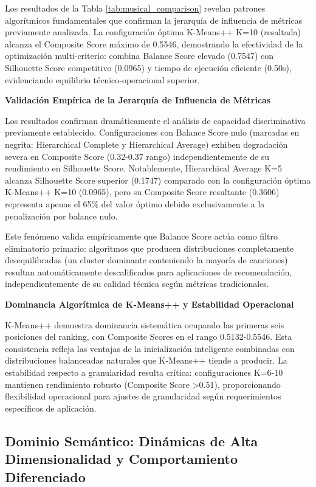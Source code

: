 \documentclass[12pt,a4paper]{report}
\begin{document}
Los resultados de la Tabla \ref{tab:musical_comparison} revelan patrones algorítmicos fundamentales que confirman la jerarquía de influencia de métricas previamente analizada. La configuración óptima K-Means++ K=10 (resaltada) alcanza el Composite Score máximo de 0.5546, demostrando la efectividad de la optimización multi-criterio: combina Balance Score elevado (0.7547) con Silhouette Score competitivo (0.0965) y tiempo de ejecución eficiente (0.50s), evidenciando equilibrio técnico-operacional superior.

\textbf{Validación Empírica de la Jerarquía de Influencia de Métricas}

Los resultados confirman dramáticamente el análisis de capacidad discriminativa previamente establecido. Configuraciones con Balance Score nulo (marcadas en negrita: Hierarchical Complete y Hierarchical Average) exhiben degradación severa en Composite Score (0.32-0.37 rango) independientemente de su rendimiento en Silhouette Score. Notablemente, Hierarchical Average K=5 alcanza Silhouette Score superior (0.1747) comparado con la configuración óptima K-Means++ K=10 (0.0965), pero su Composite Score resultante (0.3606) representa apenas el 65\% del valor óptimo debido exclusivamente a la penalización por balance nulo.

Este fenómeno valida empíricamente que Balance Score actúa como filtro eliminatorio primario: algoritmos que producen distribuciones completamente desequilibradas (un cluster dominante conteniendo la mayoría de canciones) resultan automáticamente descalificados para aplicaciones de recomendación, independientemente de su calidad técnica según métricas tradicionales.

\textbf{Dominancia Algorítmica de K-Means++ y Estabilidad Operacional}

K-Means++ demuestra dominancia sistemática ocupando las primeras seis posiciones del ranking, con Composite Scores en el rango 0.5132-0.5546. Esta consistencia refleja las ventajas de la inicialización inteligente combinadas con distribuciones balanceadas naturales que K-Means++ tiende a producir. La estabilidad respecto a granularidad resulta crítica: configuraciones K=6-10 mantienen rendimiento robusto (Composite Score >0.51), proporcionando flexibilidad operacional para ajustes de granularidad según requerimientos específicos de aplicación.

\subsection{Dominio Semántico: Dinámicas de Alta Dimensionalidad y Comportamiento Diferenciado}
\end{document}
